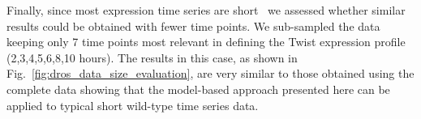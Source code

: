 \documentclass{pnastwo}
\begin{document}
\begin{article}


Finally, since most expression time series are short~\cite{Ernst2005}
we assessed whether similar results could be obtained with fewer time
points. We sub-sampled the data keeping only 7 time points most
relevant in defining the Twist expression profile
(2,3,4,5,6,8,10 hours). The results in this case, as shown in
Fig.~\ref{fig:dros_data_size_evaluation}, are very similar to 
those obtained using the complete data showing that the model-based
approach presented here can be applied to typical short wild-type time
series data.


\end{article}
\end{document}
